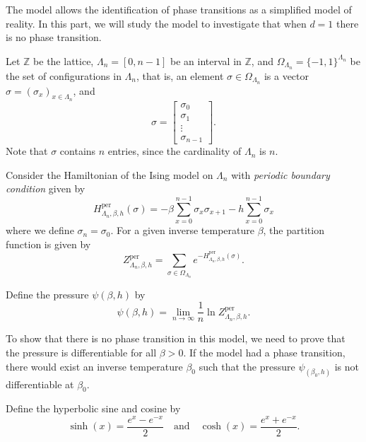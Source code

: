 \documentclass[11pt]{book}
\begin{document}
The model allows the identification of phase transitions as a simplified model of reality. In this part, we will study the model to investigate that when $d=1$ there is no phase transition.

Let $\mathbb{Z}$ be the lattice, $\Lambda_n=[0,n-1]$ be an interval in $\mathbb{Z}$, and $\Omega_{\Lambda_n} = \{-1,1\}^{\Lambda_n}$ be the set of configurations in $\Lambda_n$, that is, an element $\sigma \in \Omega_{\Lambda_n}$ is a vector $\sigma=(\sigma_x)_{x\in \Lambda_n}$, and
$$
\sigma = 
\begin{bmatrix}
\sigma_0 \\ \sigma_1 \\ \vdots \\ \sigma_{n-1}
\end{bmatrix}.
$$
Note that $\sigma$ contains $n$ entries, since the cardinality of $\Lambda_n$ is $n$.

Consider the Hamiltonian of the Ising model on $\Lambda_n$ with \emph{periodic boundary condition} given by
\begin{equation}\label{hamiltonian_ising}
   H^{\text{per}}_{\Lambda_n,\beta,h}(\sigma) = -\beta\sum_{x=0}^{n-1} \sigma_x\sigma_{x+1} - h\sum_{x=0}^{n-1}\sigma_x 
\end{equation}
where we define $\sigma_n = \sigma_0$. For a given inverse temperature $\beta$, the partition function is given by
\begin{equation}\label{partition_function}
Z^{\text{per}}_{\Lambda_n,\beta,h} = \sum_{\sigma \in \Omega_{\Lambda_n}} e^{-H^{\text{per}}_{\Lambda_n,\beta,h}(\sigma)}.
\end{equation}

Define the pressure $\psi(\beta,h)$ by
\begin{equation}\label{pressure_function}
\psi(\beta,h) = \lim_{n\to \infty} \frac{1}{n}\ln Z^{\text{per}}_{\Lambda_n,\beta,h}.
\end{equation}

To show that there is no phase transition in this model, we need to prove that the pressure is differentiable for all $\beta > 0$. If the model had a phase transition, there would exist an inverse temperature $\beta_0$ such that the pressure $\psi_(\beta_0,h)$ is not differentiable at $\beta_0$.

Define the hyperbolic sine and cosine by
\begin{equation}\label{hyperbolic_sine_cosine}
\sinh(x) = \frac{e^x - e^{-x}}{2} \quad \text{and} \quad \cosh(x) = \frac{e^x + e^{-x}}{2}.
\end{equation}
\end{document}
